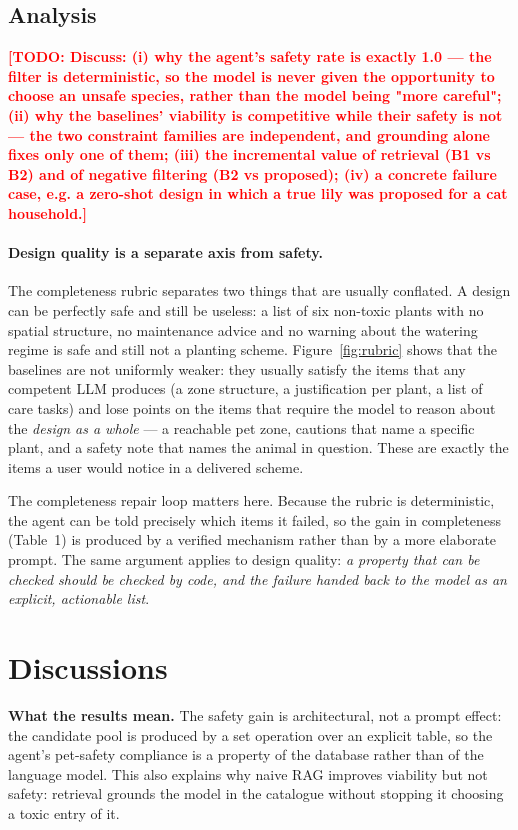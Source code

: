 \documentclass[12pt,a4paper]{article}
\newcommand{\todo}[1]{\textcolor{red}{\textbf{[TODO: #1]}}}
\begin{document}
\subsection{Analysis}

\todo{Discuss: (i) why the agent's safety rate is exactly 1.0 --- the filter
is deterministic, so the model is never given the opportunity to choose an
unsafe species, rather than the model being "more careful"; (ii) why the
baselines' viability is competitive while their safety is not --- the two
constraint families are independent, and grounding alone fixes only one of
them; (iii) the incremental value of retrieval (B1 vs B2) and of negative
filtering (B2 vs proposed); (iv) a concrete failure case, e.g. a zero-shot
design in which a true lily was proposed for a cat household.}

\paragraph{Design quality is a separate axis from safety.}
The completeness rubric separates two things that are usually conflated. A
design can be perfectly safe and still be useless: a list of six
non-toxic plants with no spatial structure, no maintenance advice and no
warning about the watering regime is safe and still not a planting scheme.
Figure~\ref{fig:rubric} shows that the baselines are not uniformly weaker:
they usually satisfy the items that any competent LLM produces (a zone
structure, a justification per plant, a list of care tasks) and lose points
on the items that require the model to reason about the \emph{design as a
whole} --- a reachable pet zone, cautions that name a specific plant, and a
safety note that names the animal in question. These are exactly the items
a user would notice in a delivered scheme.

The completeness repair loop matters here. Because the rubric is
deterministic, the agent can be told precisely which items it failed, so the
gain in completeness (Table~1) is produced by a verified mechanism rather
than by a more elaborate prompt. The same argument applies to design
quality: \emph{a property that can be checked should be checked by code, and
the failure handed back to the model as an explicit, actionable list}.

\section{Discussions}

\textbf{What the results mean.} The safety gain is architectural, not a prompt
effect: the candidate pool is produced by a set operation over an explicit
table, so the agent's pet-safety compliance is a property of the database
rather than of the language model. This also explains why naive RAG improves
viability but not safety: retrieval grounds the model in the catalogue without
stopping it choosing a toxic entry of it.
\end{document}
